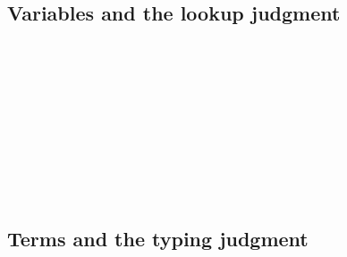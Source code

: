 \hypertarget{variables-and-the-lookup-judgment}{%
\subsection{Variables and the lookup
judgment}\label{variables-and-the-lookup-judgment}}

\begin{fence}
\begin{code}%
\>[0]\AgdaSpace{}%
\AgdaSpace{}%
\AgdaSymbol{:}\AgdaSpace{}%
\AgdaSpace{}%
\AgdaSpace{}%
\AgdaSpace{}%
\AgdaSpace{}%
\AgdaSpace{}%
\<%
\\
%
\\[\AgdaEmptyExtraSkip]%
\>[0][@{}l@{\AgdaIndent{0}}]%
\>[2]%
\>[87I]\AgdaSymbol{:}%
\>[88I]\AgdaSpace{}%
\AgdaSymbol{\{}\AgdaSpace{}%
\AgdaSymbol{\}}\<%
\\
\>[.][@{}l@{}]\<[88I]%
\>[6]\AgdaComment{---------}\<%
\\
\>[.][@{}l@{}]\<[87I]%
\>[4]\AgdaSpace{}%
\AgdaSpace{}%
\AgdaOperator{\AgdaInductiveConstructor{,}}\AgdaSpace{}%
\AgdaSpace{}%
\AgdaSpace{}%
\<%
\\
%
\\[\AgdaEmptyExtraSkip]%
%
\>[2]\AgdaSpace{}%
\AgdaSymbol{:}\AgdaSpace{}%
\AgdaSpace{}%
\AgdaSymbol{\{}\AgdaSpace{}%
\AgdaSpace{}%
\AgdaSymbol{\}}\<%
\\
\>[2][@{}l@{\AgdaIndent{0}}]%
\>[4]%
\>[101I]\AgdaSpace{}%
\AgdaSpace{}%
\<%
\\
\>[.][@{}l@{}]\<[101I]%
\>[6]\AgdaComment{---------}\<%
\\
%
\>[4]\AgdaSpace{}%
\AgdaSpace{}%
\AgdaOperator{\AgdaInductiveConstructor{,}}\AgdaSpace{}%
\AgdaSpace{}%
\AgdaSpace{}%
\<%
\end{code}
\end{fence}

\hypertarget{terms-and-the-typing-judgment}{%
\subsection{Terms and the typing
judgment}\label{terms-and-the-typing-judgment}}

